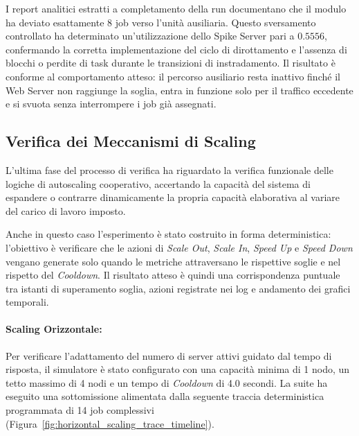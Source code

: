 ﻿\documentclass[a4paper,12pt]{article}
\begin{document}
I report analitici estratti a completamento della run documentano che il modulo ha deviato esattamente $8$ job verso l'unità ausiliaria. Questo sversamento controllato ha determinato un'utilizzazione dello Spike Server pari a $0.5556$, confermando la corretta implementazione del ciclo di dirottamento e l'assenza di blocchi o perdite di task durante le transizioni di instradamento. Il risultato è conforme al comportamento atteso: il percorso ausiliario resta inattivo finché il Web Server non raggiunge la soglia, entra in funzione solo per il traffico eccedente e si svuota senza interrompere i job già assegnati.


\subsection{Verifica dei Meccanismi di Scaling}
L'ultima fase del processo di verifica ha riguardato la verifica funzionale delle logiche di autoscaling cooperativo, accertando la capacità del sistema di espandere o contrarre dinamicamente la propria capacità elaborativa al variare del carico di lavoro imposto.

Anche in questo caso l'esperimento è stato costruito in forma deterministica: l'obiettivo è verificare che le azioni di \textit{Scale Out}, \textit{Scale In}, \textit{Speed Up} e \textit{Speed Down} vengano generate solo quando le metriche attraversano le rispettive soglie e nel rispetto del \textit{Cooldown}. Il risultato atteso è quindi una corrispondenza puntuale tra istanti di superamento soglia, azioni registrate nei log e andamento dei grafici temporali.

\paragraph{Scaling Orizzontale:}
Per verificare l'adattamento del numero di server attivi guidato dal tempo di risposta, il simulatore è stato configurato con una capacità minima di 1 nodo, un tetto massimo di 4 nodi e un tempo di \textit{Cooldown} di 4.0 secondi. La suite ha eseguito una sottomissione alimentata dalla seguente traccia deterministica programmata di 14 job complessivi (Figura~\ref{fig:horizontal_scaling_trace_timeline}).
\end{document}
